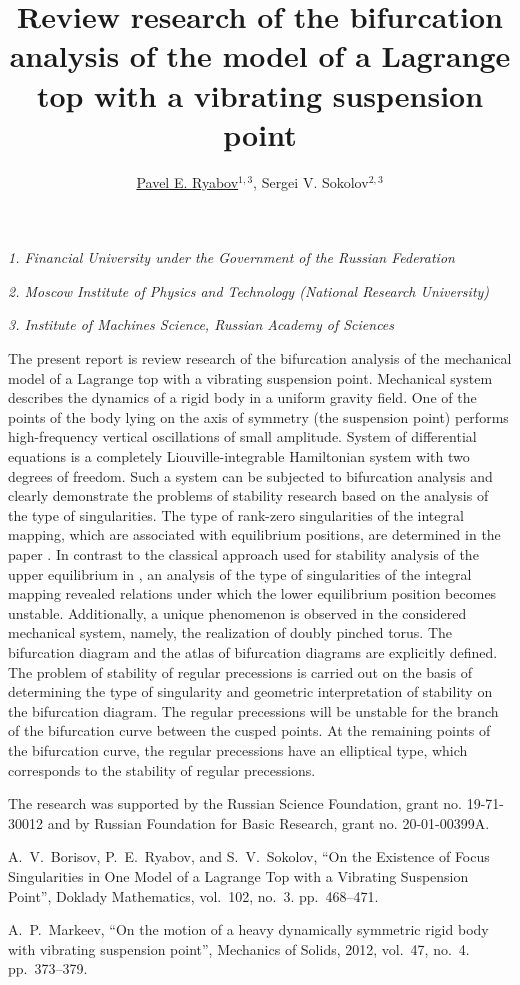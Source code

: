 \documentclass[12pt]{article}
\title{\bf\Large Review research of the bifurcation analysis of the model of a Lagrange top with a vibrating suspension point}
\author{\underline{Pavel E. Ryabov}$^{1, 3}$, Sergei V. Sokolov$^{2, 3}$}
\date{}
\begin{document}
	
\begin{center}
	\maketitle
	{\large\textit{1. Financial University under the Government of the Russian Federation}}
	
	{\large\textit{2. Moscow Institute of Physics and Technology (National Research University)}}
	
	{\large\textit{3. Institute of Machines Science, Russian Academy of Sciences}}
\end{center}


The present report is review research of the bifurcation analysis of the mechanical model of a Lagrange top with a vibrating suspension point.
Mechanical system  describes the dynamics of a rigid body in a uniform gravity field. One of the points of the body lying on the axis of symmetry (the suspension point) performs high-frequency vertical oscillations of small amplitude.  System of differential equations is a completely Liouville-integrable Hamiltonian system with two degrees of freedom. Such a system can be subjected to bifurcation analysis and clearly demonstrate the problems of stability research based on the analysis of the type of singularities. The type of rank-zero singularities of the integral mapping, which are associated with equilibrium positions, are determined in the paper \cite{BorRyabSok2020}. In contrast to the classical approach used for stability analysis of the upper equilibrium in \cite{Markeev2012}, an analysis of the type of singularities of the integral mapping revealed relations under which the lower equilibrium position becomes unstable. Additionally, a unique phenomenon is observed in the considered mechanical system, namely, the realization of doubly pinched torus. The bifurcation diagram and the atlas of bifurcation diagrams are explicitly defined. The problem of stability of regular precessions is carried out on the basis of determining the type of singularity and geometric interpretation of stability on the bifurcation diagram. The regular precessions will be unstable for the branch of the bifurcation curve between the cusped points. At the remaining points of the bifurcation curve, the regular precessions have an elliptical type, which corresponds to the stability of regular precessions.

The research was supported by the Russian Science Foundation, grant no. 19-71-30012 and by Russian Foundation for Basic Research, grant no. 20-01-00399A.


\begin{thebibliography}{99}
	 A.~V.~Borisov,  P.~E.~Ryabov, and S.~V.~Sokolov,
``On the Existence of Focus Singularities in One Model of a Lagrange Top with a Vibrating Suspension Point'', Doklady Mathematics, vol.~102, no.~3. pp.~468--471.

 A.~P.~Markeev, ``On the motion of a heavy dynamically symmetric rigid body with vibrating suspension point'', Mechanics of Solids, 2012, vol.~47, no.~4. pp.~373--379.
\end{thebibliography}
\end{document}
